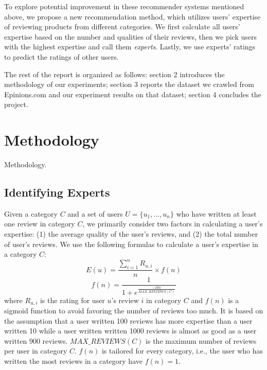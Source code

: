 \documentclass[12pt]{article}
\begin{document}
To explore potential improvement in these recommender systems mentioned above, we propose a new recommendation method, which utilizes users' expertise of reviewing products from different categories. We first calculate all users' expertise based on the number and qualities of their reviews, then we pick users with the highest expertise and call them \emph{experts}. Lastly, we use experts' ratings to predict the ratings of other users. 

The rest of the report is organized as follows: section 2 introduces the methodology of our experiments; section 3 reports the dataset we crawled from Epinions.com and our experiment results on that dataset; section 4 concludes the project. 

\section{Methodology}
Methodology.

\subsection{Identifying Experts} %
\label{sub:identifying_experts}

Given a category $C$ and a set of users $U = \{{u_{1}, ..., u_{n}}\}$ who have written at least one review in category $C$, we primarily consider two factors in calculating a user's expertise: (1) the average quality of the user's reviews, and (2) the total number of user's reviews. We use the following formulas to calculate a user's expertise in a category $C$:
\begin{equation}
E(u) = \frac{\sum_{i=1}^n R_{u, i}} {n} \times f(n)
\end{equation}
\begin{equation}
f(n) = \frac{1}{1 + e^{\frac{-10n} {MAX\_REVIEWS(C)}}}
\end{equation}
where $R_{u, i}$ is the rating for user $u$'s review $i$ in category $C$ and $f(n)$ is a sigmoid function to avoid favoring the number of reviews too much. It is based on the assumption that a user written 100 reviews has more expertise than a user written 10 while a user written written 1000 reviews is almost as good as a user written 900 reviews. $MAX\_REVIEWS(C)$ is the maximum number of reviews per user in category $C$. $f(n)$ is tailored for every category, i.e., the user who has written the most reviews in a category have $f(n)=1$.
\end{document}
